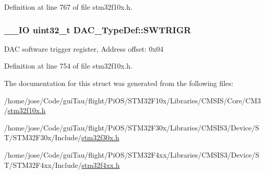 Definition at line 767 of file stm32f10x.\-h.

\hypertarget{struct_d_a_c___type_def_a4ccb66068a1ebee1179574dda20206b6}{
\subsubsection[{S\-W\-T\-R\-I\-G\-R}]{\setlength{\rightskip}{0pt plus 5cm}\-\_\-\-\_\-\-I\-O {\bf uint32\-\_\-t} D\-A\-C\-\_\-\-Type\-Def\-::\-S\-W\-T\-R\-I\-G\-R}}\label{struct_d_a_c___type_def_a4ccb66068a1ebee1179574dda20206b6}
D\-A\-C software trigger register, Address offset\-: 0x04 

Definition at line 754 of file stm32f10x.\-h.



The documentation for this struct was generated from the following files\-:\begin{DoxyCompactItemize}
\item 
/home/jose/\-Code/gui\-Tau/flight/\-Pi\-O\-S/\-S\-T\-M32\-F10x/\-Libraries/\-C\-M\-S\-I\-S/\-Core/\-C\-M3/\hyperlink{stm32f10x_8h}{stm32f10x.\-h}\item 
/home/jose/\-Code/gui\-Tau/flight/\-Pi\-O\-S/\-S\-T\-M32\-F30x/\-Libraries/\-C\-M\-S\-I\-S3/\-Device/\-S\-T/\-S\-T\-M32\-F30x/\-Include/\hyperlink{stm32f30x_8h}{stm32f30x.\-h}\item 
/home/jose/\-Code/gui\-Tau/flight/\-Pi\-O\-S/\-S\-T\-M32\-F4xx/\-Libraries/\-C\-M\-S\-I\-S3/\-Device/\-S\-T/\-S\-T\-M32\-F4xx/\-Include/\hyperlink{stm32f4xx_8h}{stm32f4xx.\-h}\end{DoxyCompactItemize}
